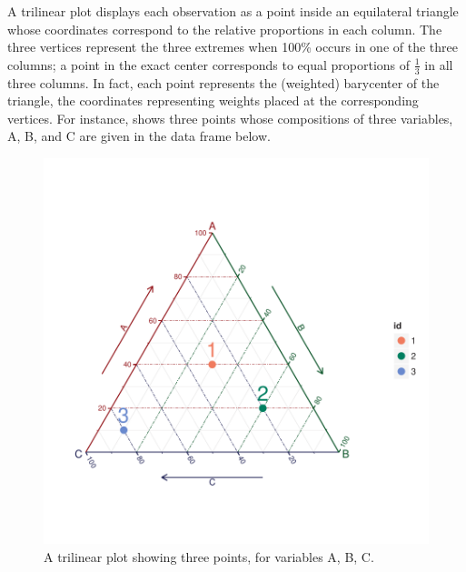 \documentclass[10pt,krantz2]{krantz}\usepackage[]{graphicx}\usepackage[]{color}
\newenvironment{knitrout}{}{} %
\renewenvironment{knitrout}{\small\renewcommand{\baselinestretch}{.85}}{} %
\begin{document}
A trilinear plot displays each observation as a point inside
an equilateral triangle whose coordinates correspond to the
relative proportions in each column.
The three vertices represent the three extremes when 100\%
occurs in one of the three columns; a point in the exact
center corresponds to equal proportions of $\frac13$ in
all three columns.  In fact, each point represents the (weighted)
barycenter of the triangle, the coordinates representing weights
placed at the corresponding vertices. For instance, 
shows three points whose compositions of three variables,
A, B, and C are given in the data frame  below.
\begin{knitrout}
\color{fgcolor}\begin{figure}[!htbp]

\centerline{\includegraphics[width=.6\textwidth,trim=20 20 20 20,clip]{ch04/fig/tripdemo2-1} }

\caption[A trilinear plot showing three points, for variables A, B, C]{A trilinear plot showing three points, for variables A, B, C.}\label{fig:tripdemo2}
\end{figure}


\end{knitrout}
\end{document}
